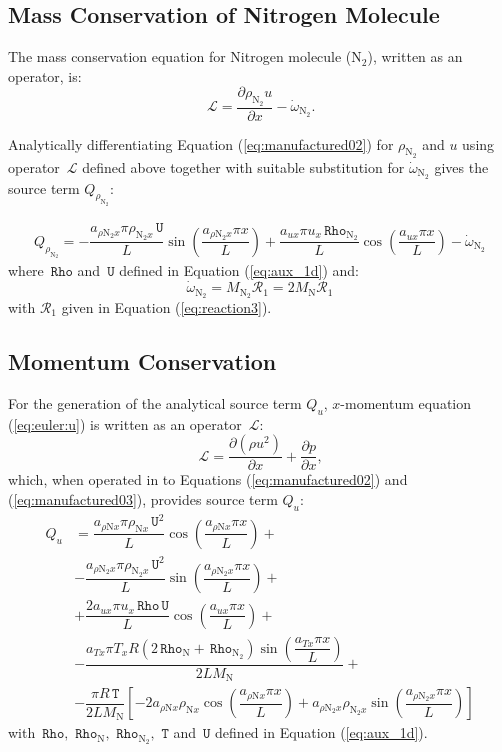 \documentclass[10pt]{article}
\newcommand{\Diff}[2] {\dfrac{\partial( #1)}{\partial #2}}
\newcommand{\diff}[2] {\dfrac{\partial #1 }{\partial #2}}
\newcommand{\Lo}{\,\mathcal{L}}
\newcommand{\Rho}{\,\mathtt{Rho}}
\newcommand{\T}{\,\mathtt{T}}
\newcommand{\U}{\,\mathtt{U}}
\newcommand{\N}{\text{N}}
\begin{document}
\subsection{Mass Conservation of Nitrogen Molecule}

The mass conservation equation for Nitrogen molecule ($\text{N}_2$), written as an operator, is:
\begin{equation*}
 \label{eq:euler1d_11a}
\Lo =  \diff{\rho_{\text{N}_2} u }{x} - \dot{\omega}_{\text{N}_2}.
\end{equation*}

Analytically differentiating Equation (\ref{eq:manufactured02}) for $\rho_{\text{N}_2}$ and $u$ using operator $\Lo$ defined above together with suitable substitution for $\dot{\omega}_{\text{N}_2}$ gives the source term $Q_{\rho_{\text{N}_2}}$:

\begin{equation}
\begin{split}
Q_{\rho_{\N_2}} = -\dfrac{a_{  \rho \N_2 x } \pi \rho_{\N_2 x} \U }{L}\sin\left(\dfrac{a_{  \rho \N_2 x } \pi x}{L}\right) +\dfrac{a_{ux} \pi u_x \Rho_{\N_2}}{L} \cos\left(\dfrac{a_{ux} \pi x}{L}\right) -\dot{\omega}_{\N_2}
\end{split}
\end{equation}
where $\Rho$ and $\U$ defined in Equation (\ref{eq:aux_1d}) and:
$$
\dot{\omega}_{\N_2} =  M_{\N_2} \mathcal{R}_1	= 2 M_\N \mathcal{R}_1	
$$
with  $\mathcal{R}_1$ given in Equation (\ref{eq:reaction3}).


\subsection{Momentum Conservation}

For the generation of the analytical source term $Q_u$, $x$-momentum equation (\ref{eq:euler:u}) is written as an operator $\Lo$:
\begin{equation*}
 \label{eq:euler1d_12}
\Lo =\Diff{\rho u^2}{x}+\diff{p}{x},
\end{equation*}
which, when operated in to Equations (\ref{eq:manufactured02}) and (\ref{eq:manufactured03}), provides source term $Q_{u}$:
%
\begin{equation}
\begin{split}
Q_u &=\dfrac{ a_{  \rho \N x } \pi \rho_{\N x} \U^2  }{L}\cos\left(\dfrac{a_{  \rho \N x } \pi x}{L}\right) +\\ 
&-\dfrac{a_{  \rho \N_2 x } \pi \rho_{\N_2 x} \U^2  }{L}\sin\left(\dfrac{a_{  \rho \N_2 x } \pi x}{L}\right) +\\ 
&+\dfrac{2 a_{ux} \pi u_x \Rho \U }{L}\cos\left(\dfrac{a_{ux} \pi x}{L}\right)  +\\ 
&-\dfrac{ a_{Tx} \pi T_x R  (2 \Rho_{\N}+\Rho_{\N_2})\sin\left(\dfrac{a_{Tx} \pi x}{L}\right) }{2L M_\N} +\\ 
&-\dfrac{ \pi R \T}{2L M_\N} \left[-2 a_{  \rho \N x } \rho_{\N x} \cos\left(\dfrac{a_{  \rho \N x } \pi x}{L}\right) +a_{  \rho \N_2 x } \rho_{\N_2 x} \sin\left(\dfrac{a_{  \rho \N_2 x } \pi x}{L}\right) \right]
\end{split}
\end{equation}
with $\Rho,\,\Rho_{\text{N}},\,\Rho_{\text{N}_2},\, \T$ and $\U$ defined in Equation (\ref{eq:aux_1d}).
\end{document}
